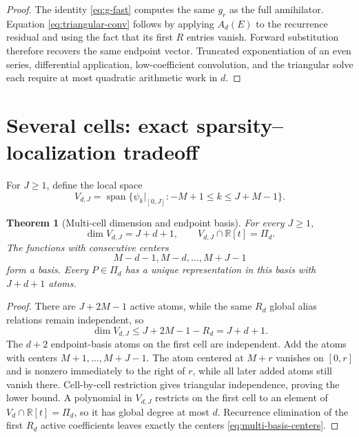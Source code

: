 \documentclass[11pt,oneside]{article}
\newtheorem{theorem}{Theorem}[section]
\theoremstyle{definition}
\theoremstyle{remark}
\newcommand{\R}{\mathbb R}
\newcommand{\Span}{\operatorname{span}}
\begin{document}
\begin{proof}
The identity \eqref{eq:g-fast} computes the same $g_r$ as the full annihilator.  Equation \eqref{eq:triangular-conv} follows by applying $A_d(E)$ to the recurrence residual and using the fact that its first $R$ entries vanish.  Forward substitution therefore recovers the same endpoint vector.  Truncated exponentiation of an even series, differential application, low-coefficient convolution, and the triangular solve each require at most quadratic arithmetic work in $d$.
\end{proof}

\section{Several cells: exact sparsity--localization tradeoff}
\label{sec:multicell}

For $J\ge1$, define the local space
\begin{equation}
 V_{d,J}=\Span\{\psi_k|_{[0,J]}:-M+1\le k\le J+M-1\}.    \label{eq:VdJ}
\end{equation}

\begin{theorem}[Multi-cell dimension and endpoint basis]
\label{thm:multicell}
For every $J\ge1$,
\begin{equation}
 \boxed{\dim V_{d,J}=J+d+1,\qquad
 V_{d,J}\cap\R[t]=\Pi_d.}                                \label{eq:multi-dim}
\end{equation}
The functions with consecutive centers
\begin{equation}
 M-d-1,M-d,\ldots,M+J-1                                  \label{eq:multi-basis-centers}
\end{equation}
form a basis.  Every $P\in\Pi_d$ has a unique representation in this basis with $J+d+1$ atoms.
\end{theorem}

\begin{proof}
There are $J+2M-1$ active atoms, while the same $R_d$ global alias relations remain independent, so
\[
 \dim V_{d,J}\le J+2M-1-R_d=J+d+1.
\]
The $d+2$ endpoint-basis atoms on the first cell are independent.  Add the atoms with centers $M+1,\ldots,M+J-1$.  The atom centered at $M+r$ vanishes on $[0,r]$ and is nonzero immediately to the right of $r$, while all later added atoms still vanish there.  Cell-by-cell restriction gives triangular independence, proving the lower bound.  A polynomial in $V_{d,J}$ restricts on the first cell to an element of $V_d\cap\R[t]=\Pi_d$, so it has global degree at most $d$.  Recurrence elimination of the first $R_d$ active coefficients leaves exactly the centers \eqref{eq:multi-basis-centers}.
\end{proof}
\end{document}
